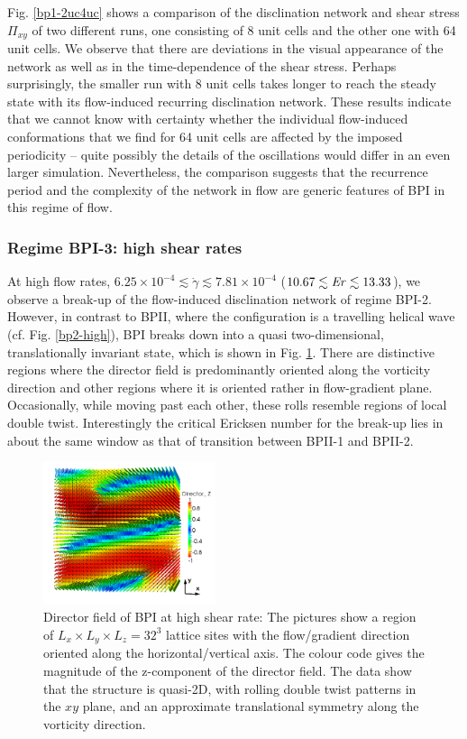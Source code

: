 \documentclass[8.5pt,twoside,twocolumn]{article}
\newcommand{\e}[1]{\times10^{#1}}
\newcommand{\gd}{\dot{\gamma}}
\begin{document}
Fig. \ref{bp1-2uc4uc} shows a comparison of the disclination network and 
shear stress $\Pi_{xy}$ of two different runs, one consisting of 8 
unit cells and the other one with 64 unit cells.
We observe that there are deviations in the visual appearance of the 
network as well as in the time-dependence of the shear stress.
Perhaps surprisingly, the smaller run with 8 unit cells takes longer 
to reach the steady state with its flow-induced recurring disclination network. 
These results indicate that we cannot know with certainty whether the individual 
flow-induced conformations that we find for 64 unit cells are affected 
by the imposed periodicity -- quite possibly the details of the oscillations
would differ in an even larger simulation. 
Nevertheless, the comparison suggests that 
the recurrence period and the complexity of the network in flow are  
generic features of BPI in this regime of flow.

\subsubsection{Regime BPI-3: high shear rates }

At high flow rates, $6.25\e{-4}\lesssim\gd\lesssim7.81\e{-4}$ ($10.67\lesssim {\it Er}\lesssim 13.33$), 
we observe a break-up of the flow-induced 
disclination network of regime BPI-2. However, 
in contrast to BPII, where the configuration is a travelling helical 
wave (cf. Fig. \ref{bp2-high}), BPI breaks down into a quasi 
two-dimensional, translationally invariant state, which is shown in 
Fig. \ref{bp1-high}. 
There are distinctive regions where the director field is 
predominantly oriented along the vorticity direction and 
other regions where it is oriented rather in flow-gradient plane. 
Occasionally, while moving past each other, these rolls resemble 
regions of local double twist.
Interestingly the critical Ericksen number for the break-up lies in 
about the same window as that of transition between BPII-1 and BPII-2. 

\begin{figure}[htpb]
\includegraphics[width=0.45\textwidth]{dir3d-z-302k_run916.png}
\caption{Director field of BPI at high shear rate: The pictures show a region 
of $L_x\times L_y \times L_z= 32^3$ lattice sites with the flow/gradient 
direction oriented along the horizontal/vertical axis. 
The colour code gives the magnitude of the z-component of the director field. 
The data show that the structure is quasi-2D, with rolling double twist
patterns in the $xy$ plane, and an approximate translational symmetry 
along the vorticity direction.}
\label{bp1-high}
\end{figure}
\end{document}
